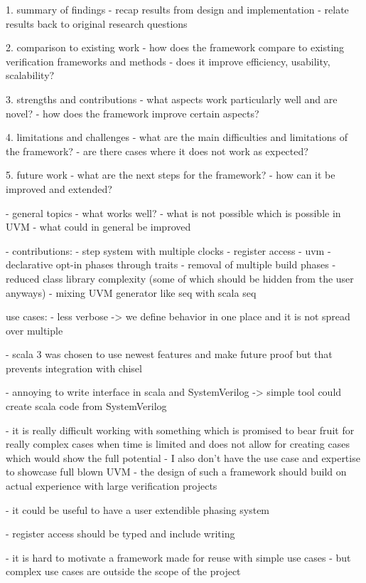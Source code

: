 1. summary of findings
- recap results from design and implementation
- relate results back to original research questions

2. comparison to existing work
- how does the framework compare to existing verification frameworks and methods
- does it improve efficiency, usability, scalability?

3. strengths and contributions
- what aspects work particularly well and are novel?
- how does the framework improve certain aspects?

4. limitations and challenges
- what are the main difficulties and limitations of the framework?
- are there cases where it does not work as expected?

5. future work
- what are the next steps for the framework?
- how can it be improved and extended?

- general topics
- what works well?
- what is not possible which is possible in UVM
- what could in general be improved


- contributions:
  - step system with multiple clocks
  - register access
  - uvm 
    - declarative opt-in phases through traits
    - removal of multiple build phases
    - reduced class library complexity (some of which should be hidden from the user anyways)
    - mixing UVM generator like seq with scala seq

use cases:
- less verbose -> we define behavior in one place and it is not spread over multiple

- scala 3 was chosen to use newest features and make future proof but that prevents integration with chisel

- annoying to write interface in scala and SystemVerilog -> simple tool could create scala code from SystemVerilog

- it is really difficult working with something which is promised to bear fruit for really complex cases when time is
limited and does not allow for creating cases which would show the full potential
- I also don't have the use case and expertise to showcase full blown UVM
- the design of such a framework should build on actual experience with large verification projects


- it could be useful to have a user extendible phasing system


- register access should be typed and include writing

- it is hard to motivate a framework made for reuse with simple use cases
- but complex use cases are outside the scope of the project


